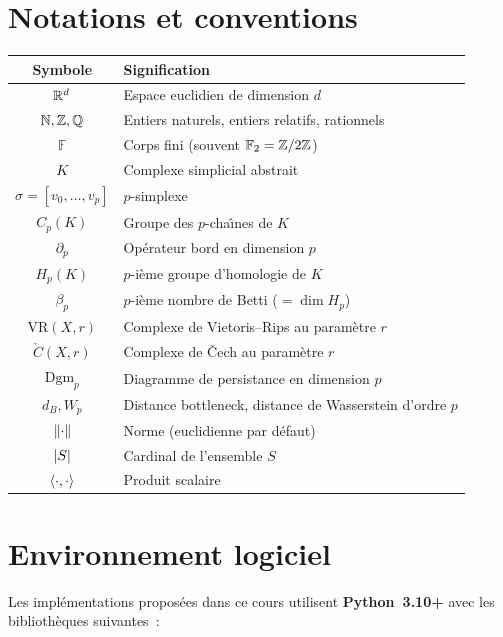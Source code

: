 \section*{Notations et conventions}

\begin{center}
\renewcommand{\arraystretch}{1.3}
\begin{tabular}{cl}
\toprule
\textbf{Symbole} & \textbf{Signification} \\
\midrule
$\mathbb{R}^d$ & Espace euclidien de dimension $d$ \\
$\mathbb{N}, \mathbb{Z}, \mathbb{Q}$ & Entiers naturels, entiers relatifs, rationnels \\
$\mathbb{F}$ & Corps fini (souvent $\mathbb{F}_2 = \mathbb{Z}/2\mathbb{Z}$) \\
$K$ & Complexe simplicial abstrait \\
$\sigma = [v_0, \ldots, v_p]$ & $p$-simplexe \\
$C_p(K)$ & Groupe des $p$-cha\^{\i}nes de $K$ \\
$\partial_p$ & Op\'erateur bord en dimension $p$ \\
$H_p(K)$ & $p$-i\`eme groupe d'homologie de $K$ \\
$\beta_p$ & $p$-i\`eme nombre de Betti ($= \dim H_p$) \\
$\mathrm{VR}(X, r)$ & Complexe de Vietoris--Rips au param\`etre $r$ \\
$\check{C}(X, r)$ & Complexe de \v{C}ech au param\`etre $r$ \\
$\mathrm{Dgm}_p$ & Diagramme de persistance en dimension $p$ \\
$d_B, W_p$ & Distance bottleneck, distance de Wasserstein d'ordre $p$ \\
$\left\| \cdot \right\|$ & Norme (euclidienne par d\'efaut) \\
$\left| S \right|$ & Cardinal de l'ensemble $S$ \\
$\langle \cdot, \cdot \rangle$ & Produit scalaire \\
\bottomrule
\end{tabular}
\end{center}

\section*{Environnement logiciel}

Les impl\'ementations propos\'ees dans ce cours utilisent
\textbf{Python~3.10+} avec les biblioth\`eques suivantes~:

